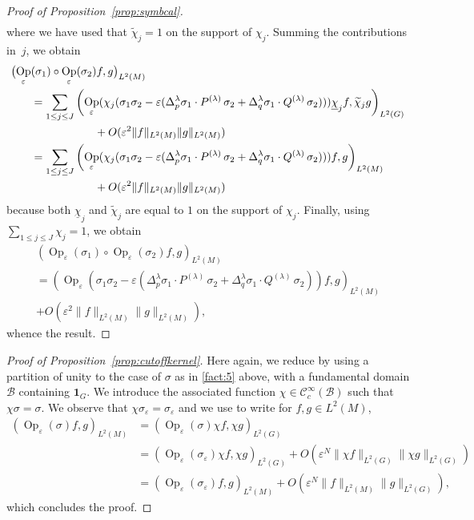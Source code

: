 \documentclass[JEP,XML,SOM,Unicode,published]{cedram}
\let\mathcal\mathscr
\newcommand{\bun}{\mathbf{1}}
\DeclareMathOperator{\Op}{Op}
\theoremstyle{plain}
\theoremstyle{definition}
\let\eps\varepsilon
\begin{document}
\begin{proof}[Proof of Proposition~\ref{prop:symbcal}]
\begin{align*}
\end{align*}
where we have used that $\widetilde \chi_j=1$ on the support of $\chi_j$.
Summing the contributions in~$j$, we obtain
\begin{align*}
\bigl(\Op_\eps &(\sigma_1)\circ \Op_\eps (\sigma_2) f,g\bigr)_{L^2(M)}\\
&= \sum_{1\leq j\leq J} \left(\Op_\eps (\chi_j (\sigma_1 \sigma_2 -\eps (\Delta_p^\lambda \sigma_1 \cdot P^{(\lambda)}\,\sigma_2+\Delta^\lambda_q \sigma_1 \cdot Q^{(\lambda)}\, \sigma_2)
)) \underline \chi_jf, \widetilde \chi_j g\right)_{L^2(G)}
\\&\hspace*{2cm}
+O(\eps^2\| f\|_{L^2(M)}\| g\|_{L^2(M)}) \\
& = \sum_{1\leq j\leq J} \left(\Op_\eps (\chi_j (\sigma_1 \sigma_2 -\eps (\Delta_p^\lambda \sigma_1 \cdot P^{(\lambda)}\,\sigma_2+\Delta^\lambda_q \sigma_1 \cdot Q^{(\lambda)}\, \sigma_2)
))f, g\right)_{L^2(M)} \\
&\hspace*{2cm}+O(\eps^2\| f\|_{L^2(M)}\| g\|_{L^2(M)})
\end{align*}
because both $\underline \chi_j$ and $\widetilde \chi_j$ are equal to $1$ on the support of $\chi_j$. Finally, using $\sum_{1\leq j\leq J} \chi_j=1$, we obtain
\begin{multline*}
\left(\Op_\eps (\sigma_1)\circ \Op_\eps (\sigma_2) f,g\right)_{L^2(M)}\\
 = \left(\Op_\eps (\sigma_1 \sigma_2 -\eps (\Delta_p^\lambda \sigma_1 \cdot P^{(\lambda)}\,\sigma_2+\Delta^\lambda_q \sigma_1 \cdot Q^{(\lambda)}\, \sigma_2))
f, g\right)_{L^2(M)} \\
+O(\eps^2\| f\|_{L^2(M)}\| g\|_{L^2(M)}),
\end{multline*}
whence the result.
\end{proof}


\begin{proof}[Proof of Proposition~\ref{prop:cutoffkernel}]
Here again, we reduce by using a partition of unity to the case of $\sigma$ as in \eqref{fact:5} above, with a fundamental domain $\mathcal B$ containing $\bun_G$. We introduce the associated function $\chi\in{\mathcal C}_c^\infty(\mathcal B)$ such that $\chi \sigma =\sigma$. We observe that $\chi\sigma_\eps=\sigma_\eps$ and we use \cite[Prop.\,3.4]{FF1} to write for $f,g\in L^2(M)$,
\begin{align*}
\left(\Op_\eps (\sigma) f,g\right)_{L^2(M)}&= \left(\Op_\eps (\sigma) \chi f,\chi g\right)_{L^2(G)}\\
&= \left(\Op_\eps (\sigma_\eps)\chi f,\chi g\right)_{L^2(G)} +O(\eps ^{N} \|\chi f\|_{L^2(G)} \| \chi g\|_{L^2(G)})\\
&= \left(\Op_\eps (\sigma_\eps) f,g\right)_{L^2(M)} +O(\eps ^{N} \| f\|_{L^2(M)} \| g\|_{L^2(G)}),
\end{align*}
which concludes the proof.
\end{proof}
\end{document}
